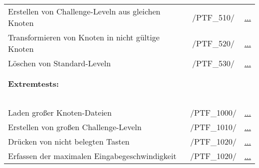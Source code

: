 \begin{longtable}{p{0.5\hsize}p{0.275\hsize}p{0.275\hsize}}
	\\
	
	  \multicolumn{1}{L{6.5cm}}{Erstellen von Challenge-Leveln aus gleichen Knoten}
	& \multicolumn{1}{c}{/PTF\_510/}
	& \multicolumn{1}{c}{\hyperref[]{...}}
	
	\\
	
	  \multicolumn{1}{L{6.5cm}}{Transformieren von Knoten in nicht gültige Knoten}
	& \multicolumn{1}{c}{/PTF\_520/}
	& \multicolumn{1}{c}{\hyperref[]{...}}
	
	\\
	
	  \multicolumn{1}{L{6.5cm}}{Löschen von Standard-Leveln}
	& \multicolumn{1}{c}{/PTF\_530/}
	& \multicolumn{1}{c}{\hyperref[]{...}}
	
	\\
	\\
	\\
	

	  \multicolumn{3}{l}{\textbf{Extremtests:}}
	  
	\\
	
	  \multicolumn{3}{l}{~}
	  
	\\
	
	  \multicolumn{1}{L{6.5cm}}{Laden großer Knoten-Dateien}
	& \multicolumn{1}{c}{/PTF\_1000/}
	& \multicolumn{1}{c}{\hyperref[]{...}}
	
	\\
	
	  \multicolumn{1}{L{6.5cm}}{Erstellen von großen Challenge-Leveln}
	& \multicolumn{1}{c}{/PTF\_1010/}
	& \multicolumn{1}{c}{\hyperref[]{...}}
	
	\\
	
	  \multicolumn{1}{L{6.5cm}}{Drücken von nicht belegten Tasten}
	& \multicolumn{1}{c}{/PTF\_1020/}
	& \multicolumn{1}{c}{\hyperref[]{...}}
	
	\\
	
	  \multicolumn{1}{L{6.5cm}}{Erfassen der maximalen Eingabegeschwindigkeit}
	& \multicolumn{1}{c}{/PTF\_1020/}
	& \multicolumn{1}{c}{\hyperref[]{...}}
	
	\\
	
\end{longtable}



